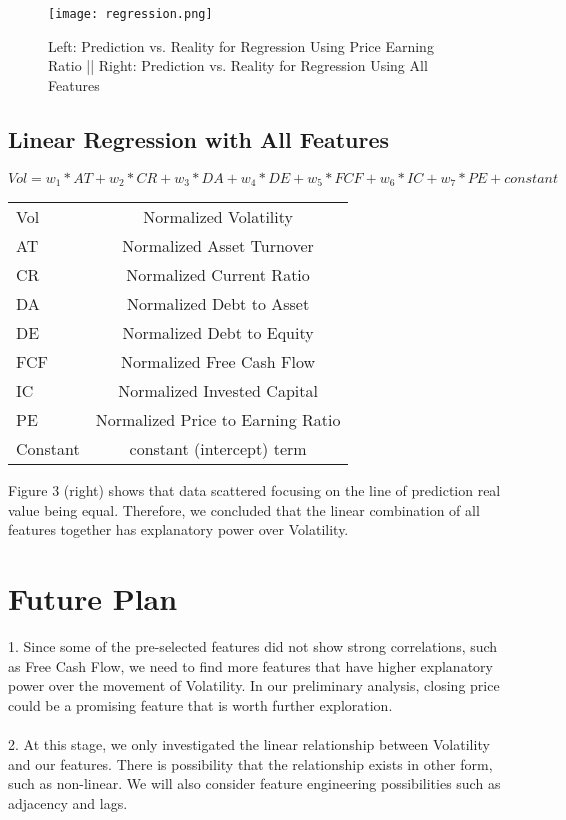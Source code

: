 \documentclass[a4paper]{article}
\begin{document}
\begin{figure}[h]
\centering
\texttt{[image: regression.png]}
\caption{\label{fig:scatter plot}Left: Prediction vs. Reality for Regression Using Price Earning Ratio || Right: Prediction vs. Reality for Regression Using All Features}
\end{figure}

\subsection{Linear Regression with All Features}
\begin{equation}
Vol = w_1*AT+w_2*CR+w_3*DA+w_4*DE+w_5*FCF+w_6*IC+w_7*PE+constant
\end{equation}
\begin{center}
\begin{tabular}{ l | c  }
 \hline
Vol & Normalized Volatility\\
AT & Normalized Asset Turnover\\
CR & Normalized Current Ratio\\
DA & Normalized Debt to Asset\\
DE & Normalized Debt to Equity\\
FCF & Normalized Free Cash Flow\\
IC & Normalized Invested Capital\\
PE & Normalized Price to Earning Ratio\\
Constant & constant (intercept) term\\
\hline
 \end{tabular}
\end{center}

Figure 3 (right) shows that data scattered focusing on the line of prediction real value being equal. Therefore, we concluded that the linear combination of all features together has explanatory power over Volatility.



\section{Future Plan}
1. Since some of the pre-selected features did not show strong correlations, such as Free Cash Flow, we need to find more features that have higher explanatory power over the movement of Volatility. In our preliminary analysis, closing price could be a promising feature that is worth further exploration.
\\\\2. At this stage, we only investigated the linear relationship between Volatility and our features. There is possibility that the relationship exists in other form, such as non-linear. We will also consider feature engineering possibilities such as adjacency and lags.
\end{document}
